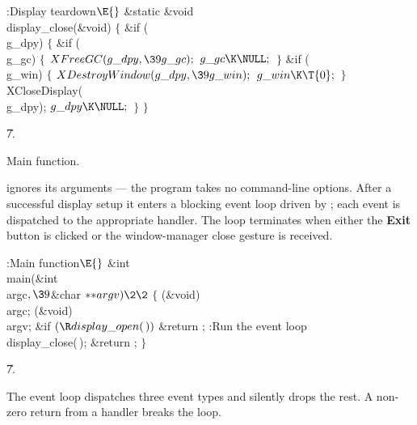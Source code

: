 \Y\B\4:Display teardown\X${}\E{}$\6
\1\1\&{static} \&{void} \\{display\_close}(\&{void})\2\2\6
${}\{{}$\1\6
\&{if} (\\{g\_dpy})\5
${}\{{}$\1\6
\&{if} (\\{g\_gc})\5
${}\{{}$\1\6
${}\\{XFreeGC}(\\{g\_dpy},\39\\{g\_gc});{}$\6
${}\\{g\_gc}\K\NULL;{}$\6
\4${}\}{}$\2\6
\&{if} (\\{g\_win})\5
${}\{{}$\1\6
${}\\{XDestroyWindow}(\\{g\_dpy},\39\\{g\_win});{}$\6
${}\\{g\_win}\K\T{0};{}$\6
\4${}\}{}$\2\6
\\{XCloseDisplay}(\\{g\_dpy});\6
${}\\{g\_dpy}\K\NULL;{}$\6
\4${}\}{}$\2\6
\4${}\}{}$\2\par
\U7.\fi

Main function.

\fi

 ignores its arguments --- the program takes no command-line
options.  After a successful display setup it enters a blocking event
loop driven by ; each event is dispatched to the
appropriate handler.  The loop terminates when either the {\bf Exit}
button is clicked or the window-manager close gesture is received.

\Y\B\4:Main function\X${}\E{}$\6
\1\1\&{int} \\{main}(\&{int} \\{argc}${},\39{}$\&{char} ${}{*}{*}\\{argv})\2%
\2{}$\6
${}\{{}$\1\6
(\&{void})\,\\{argc};\6
(\&{void})\,\\{argv};\6
\&{if} ${}(\R\\{display\_open}(\,)){}$\1\5
\&{return} ;\2\6
:Run the event loop\X\\{display\_close}(\,);\6
\&{return} ;\6
\4${}\}{}$\2\par
\U7.\fi

The event loop dispatches three event types and silently drops the
rest.  A non-zero return from a handler breaks the loop.

